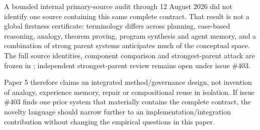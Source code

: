A bounded internal primary-source audit through 12 August 2026 did not identify one source containing this same complete contract. That result is not a global firstness certificate: terminology differs across planning, case-based reasoning, analogy, theorem proving, program synthesis and agent memory, and a combination of strong parent systems anticipates much of the conceptual space. The full source identities, component comparison and strongest-parent attack are frozen in ; independent strongest-parent review remains open under issue \#403.

Paper 5 therefore claims an integrated method/governance design, not invention of analogy, experience memory, repair or compositional reuse in isolation. If issue \#403 finds one prior system that materially contains the complete contract, the novelty language should narrow further to an implementation/integration contribution without changing the empirical questions in this paper.
